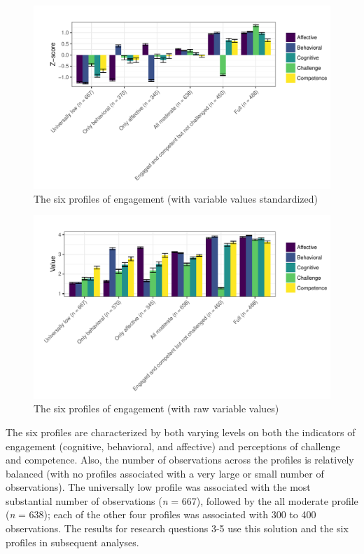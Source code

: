 \documentclass[]{book}
\theoremstyle{definition}
\theoremstyle{definition}
\theoremstyle{definition}
\theoremstyle{remark}
\begin{document}
\begin{figure}

{\centering \includegraphics[width=1\linewidth]{rosenberg-dissertation_files/figure-latex/unnamed-chunk-11-1} 

}

\caption{The six profiles of engagement (with variable values standardized)}\label{fig:unnamed-chunk-11}
\end{figure}

\begin{figure}

{\centering \includegraphics[width=1\linewidth]{rosenberg-dissertation_files/figure-latex/unnamed-chunk-12-1} 

}

\caption{The six profiles of engagement (with raw variable values)}\label{fig:unnamed-chunk-12}
\end{figure}

The six profiles are characterized by both varying levels on both the
indicators of engagement (cognitive, behavioral, and affective) and
perceptions of challenge and competence. Also, the number of
observations across the profiles is relatively balanced (with no
profiles associated with a very large or small number of observations).
The universally low profile was associated with the most substantial
number of observations (\emph{n} = 667), followed by the all moderate
profile (\emph{n} = 638); each of the other four profiles was associated
with 300 to 400 observations. The results for research questions 3-5 use
this solution and the six profiles in subsequent analyses.
\end{document}
